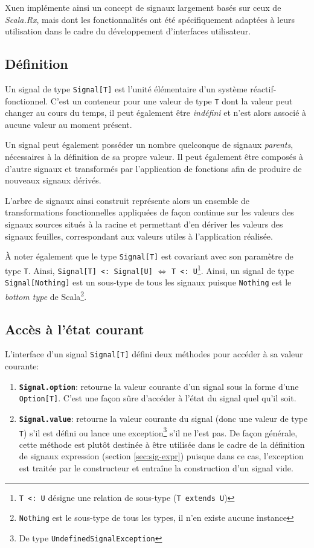 Xuen implémente ainsi un concept de signaux largement basés sur ceux de \emph{Scala.Rx}, mais dont les fonctionnalités ont été spécifiquement adaptées à leurs utilisation dans le cadre du développement d'interfaces utilisateur.

\subsection{Définition}

Un signal de type \texttt{Signal[T]} est l'unité élémentaire d'un système réactif-fonctionnel. C'est un conteneur pour une valeur de type \texttt{T} dont la valeur peut changer au cours du temps, il peut également être \emph{indéfini} et n'est alors associé à aucune valeur au moment présent.

Un signal peut également posséder un nombre quelconque de signaux \emph{parents}, nécessaires à la définition de sa propre valeur. Il peut également être composés à d'autre signaux et transformés par l'application de fonctions afin de produire de nouveaux signaux dérivés.

L'arbre de signaux ainsi construit représente alors un ensemble de transformations fonctionnelles appliquées de façon continue sur les valeurs des signaux sources situés à la racine et permettant d'en dériver les valeurs des signaux feuilles, correspondant aux valeurs utiles à l'application réalisée.

À noter également que le type \texttt{Signal[T]} est covariant avec son paramètre de type \texttt{T}. Ainsi, \texttt{Signal[T] <: Signal[U]} $\iff$ \texttt{T <: U}\footnote{\texttt{T <: U} désigne une relation de sous-type (\texttt{T extends U})}. Ainsi, un signal de type \texttt{Signal[Nothing]} est un sous-type de tous les signaux puisque \texttt{Nothing} est le \emph{bottom type} de Scala\footnote{\texttt{Nothing} est le sous-type de tous les types, il n'en existe aucune instance}.

\subsection{Accès à l'état courant}

L'interface d'un signal \texttt{Signal[T]} défini deux méthodes pour accéder à sa valeur courante:
\begin{enumerate}
	\item \textbf{\texttt{Signal.option}}: retourne la valeur courante d'un signal sous la forme d'une \texttt{Option[T]}. C'est une façon sûre d'accéder à l'état du signal quel qu'il soit.
	
	\item \textbf{\texttt{Signal.value}}: retourne la valeur courante du signal (donc une valeur de type \texttt{T}) s'il est défini ou lance une exception\footnote{De type \texttt{UndefinedSignalException}} s'il ne l'est pas. De façon générale, cette méthode est plutôt destinée à être utilisée dans le cadre de la définition de signaux expression (section \ref{sec:sig-expr}) puisque dans ce cas, l'exception est traitée par le constructeur et entraîne la construction d'un signal vide.
\end{enumerate}

